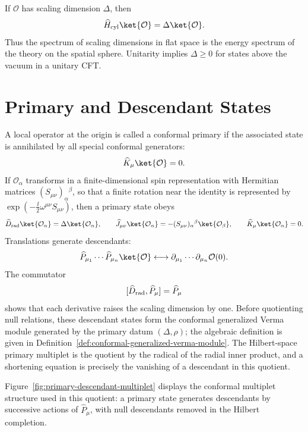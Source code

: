 If \(\mathcal O\) has scaling dimension \(\Delta\), then
\[
  \widehat H_{\mathrm{cyl}}\ket{\mathcal O}
  =
  \Delta\ket{\mathcal O}.
\]
Thus the spectrum of scaling dimensions in flat space is the energy spectrum
of the theory on the spatial sphere.  Unitarity implies \(\Delta\ge0\) for
states above the vacuum in a unitary CFT.

\section{Primary and Descendant States}

A local operator at the origin is called a conformal primary if the associated
state is annihilated by all special conformal generators:
\begin{equation}
  \widehat K_\mu\ket{\mathcal O}=0 .
  \label{eq:primary-state-condition}
\end{equation}
If \(\mathcal O_\alpha\) transforms in a finite-dimensional spin
representation with Hermitian matrices \((S_{\mu\nu})_\alpha{}^\beta\), so
that a finite rotation near the identity is represented by
\(\exp(-\frac{\ii}{2}\omega^{\mu\nu}S_{\mu\nu})\), then a primary state obeys
\[
  \widehat D_{\rm rad}\ket{\mathcal O_\alpha}
  =
  \Delta\ket{\mathcal O_\alpha},
  \qquad
  \widehat J_{\mu\nu}\ket{\mathcal O_\alpha}
  =
  -(S_{\mu\nu})_\alpha{}^\beta\ket{\mathcal O_\beta},
  \qquad
  \widehat K_\mu\ket{\mathcal O_\alpha}=0 .
\]
Translations generate descendants:
\[
  \widehat P_{\mu_1}\cdots\widehat P_{\mu_n}\ket{\mathcal O}
  \longleftrightarrow
  \partial_{\mu_1}\cdots\partial_{\mu_n}\mathcal O(0).
\]
The commutator
\[
  [\widehat D_{\rm rad},\widehat P_\mu]=\widehat P_\mu
\]
shows that each derivative raises the scaling dimension by one.
Before quotienting null relations, these descendant states form the
conformal generalized Verma module generated by the primary datum
\((\Delta,\rho)\); the algebraic definition is given in
Definition~\ref{def:conformal-generalized-verma-module}.  The Hilbert-space
primary multiplet is the quotient by the radical of the radial inner product,
and a shortening equation is precisely the vanishing of a descendant in this
quotient.

Figure~\ref{fig:primary-descendant-multiplet} displays the conformal multiplet
structure used in this quotient: a primary state generates descendants by
successive actions of \(\widehat P_\mu\), with null descendants removed in the
Hilbert completion.

